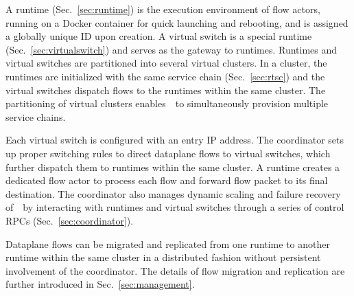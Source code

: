 A runtime (Sec.~\ref{sec:runtime}) is the execution environment of flow actors, running on a Docker container \cite{docker} for quick launching and rebooting, and is assigned a globally unique ID upon creation. A virtual switch is a special runtime (Sec.~\ref{sec:virtualswitch}) and serves as the gateway to runtimes.
Runtimes and virtual switches are partitioned into several virtual clusters. In a cluster, the runtimes are initialized with the same service chain (Sec.~\ref{sec:rtsc}) and the virtual switches dispatch flows to the runtimes within the same cluster. The partitioning of virtual clusters enables~\nfactor~to simultaneously provision multiple service chains.

Each virtual switch is configured with an entry IP address. The coordinator sets up proper switching rules %
to direct dataplane flows to virtual switches, which further dispatch them to runtimes within the same cluster. A runtime creates a dedicated flow actor to process each flow and forward flow packet to its final destination.
The coordinator also manages dynamic scaling and failure recovery of~\nfactor~by interacting with runtimes and virtual switches through a series of control RPCs (Sec.~\ref{sec:coordinator}).

Dataplane flows can be migrated and replicated from one runtime to another runtime within the same cluster in a distributed fashion without persistent involvement of the coordinator. The details of flow migration and replication are further introduced in Sec.~\ref{sec:management}.



